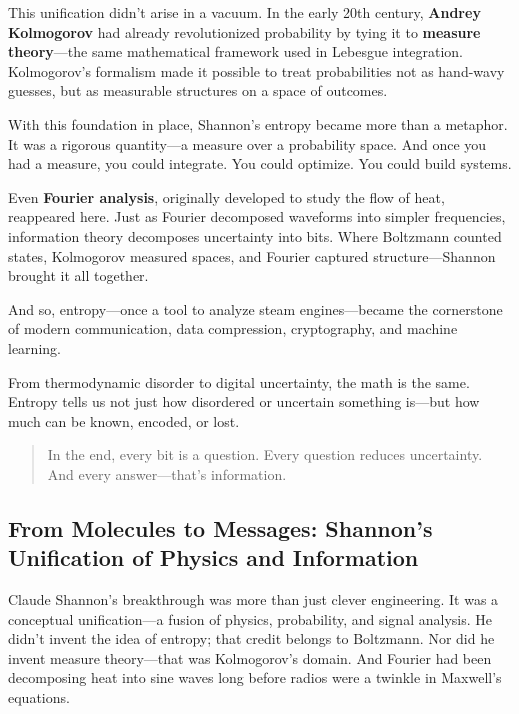 This unification didn’t arise in a vacuum. In the early 20th century, \textbf{Andrey Kolmogorov} had already revolutionized probability by tying it to \textbf{measure theory}—the same mathematical framework used in Lebesgue integration. Kolmogorov’s formalism made it possible to treat probabilities not as hand-wavy guesses, but as measurable structures on a space of outcomes.

With this foundation in place, Shannon’s entropy became more than a metaphor. It was a rigorous quantity—a measure over a probability space. And once you had a measure, you could integrate. You could optimize. You could build systems.

Even \textbf{Fourier analysis}, originally developed to study the flow of heat, reappeared here. Just as Fourier decomposed waveforms into simpler frequencies, information theory decomposes uncertainty into bits. Where Boltzmann counted states, Kolmogorov measured spaces, and Fourier captured structure—Shannon brought it all together.

And so, entropy—once a tool to analyze steam engines—became the cornerstone of modern communication, data compression, cryptography, and machine learning.

From thermodynamic disorder to digital uncertainty, the math is the same. Entropy tells us not just how disordered or uncertain something is—but how much can be known, encoded, or lost.

\begin{quote}
In the end, every bit is a question. Every question reduces uncertainty. And every answer—that’s information.
\end{quote}








\subsection{From Molecules to Messages: Shannon’s Unification of Physics and Information}

Claude Shannon’s breakthrough was more than just clever engineering. It was a conceptual unification—a fusion of physics, probability, and signal analysis. He didn’t invent the idea of entropy; that credit belongs to Boltzmann. Nor did he invent measure theory—that was Kolmogorov’s domain. And Fourier had been decomposing heat into sine waves long before radios were a twinkle in Maxwell’s equations.

